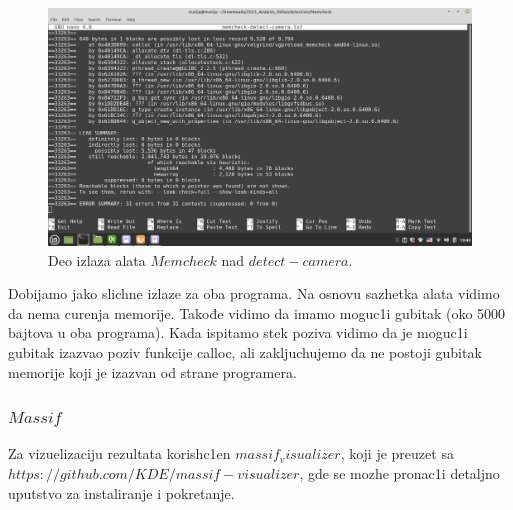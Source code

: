 \documentclass{article}
\begin{document}
\begin{figure}[H]
    \centering
    \includegraphics[width=12cm]{img/memcheck/memcheck_detect_camera.png}
    \caption{Deo izlaza alata $Memcheck$ nad $detect-camera.$}
    \label{dc:mcheck}
\end{figure}
Dobijamo jako slichne izlaze za oba programa. Na osnovu sazhetka alata vidimo da nema curenja memorije. 
Takođe vidimo da imamo moguc1i gubitak (oko 5000 bajtova u oba programa). Kada ispitamo stek poziva vidimo da je moguc1i gubitak izazvao poziv funkcije calloc, ali zakljuchujemo da ne postoji gubitak memorije koji je izazvan od strane programera.
\subsubsection{$Massif$}

Za vizuelizaciju rezultata korish\-c1en $massif_visualizer$, koji je preuzet sa \href{https://github.com/KDE/massif-visualizer}{$https://github.com/KDE/massif-visualizer$}, gde se mozhe pronac1i detaljno uputstvo za instaliranje i pokretanje.
\end{document}
